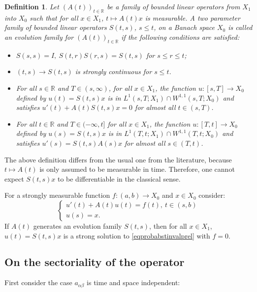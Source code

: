 \documentclass{amsart}
\theoremstyle{plain}
\theoremstyle{remark}
\theoremstyle{plain}
\newtheorem{definition}[theorem]{Definition}
\numberwithin{equation}{section}
\begin{document}
\begin{definition}\label{def:evolut}
Let $(A(t))_{t\in { \mathbb{R} }}$ be a family of bounded linear operators from $X_1$ into $X_0$ such that for all $x\in X_1$, $t\mapsto A(t)x$ is measurable.
A two parameter family of bounded linear operators $S(t,s)$, $s\leq t$, on a Banach space $X_{0}$ is called an \textit{evolution family for $(A(t))_{t\in { \mathbb{R} }}$} if the following conditions are satisfied:
\begin{itemize}
\item[(i)] $S(s,s)=I,\ S(t,r)S(r,s)=S(t,s)$ for $s\leq r\leq t$;
\item[(ii)] $(t,s)\rightarrow S(t,s)$ is strongly continuous for $s\leq t$.
\item[(iii)] For all $s\in { \mathbb{R} }$ and $T\in (s, \infty)$, for all $x\in X_1$, the function $u:[s,T]\to X_0$
defined by $u(t) = S(t,s)x$ is in $L^1(s,T;X_1)\cap W^{1,1}(s,T;X_0)$ and satisfies $u'(t) + A(t) S(t,s)x=0$ for almost all $t\in(s,T)$.
\item[(iv)]
For all $t\in { \mathbb{R} }$ and $T\in (-\infty, t]$ for all $x\in X_1$, the function $u:[T,t]\to X_0$ defined by $u(s) = S(t,s)x$ is in $L^{1}(T,t;X_1)\cap W^{1,1}(T,t;X_0)$ and satisfies $u'(s) = S(t,s) A(s) x$ for almost all $s\in (T, t)$.
\end{itemize}
\end{definition}
The above definition differs from the usual one from the literature, because $t\mapsto A(t)$ is only assumed to be measurable in time. Therefore, one cannot expect $S(t,s)x$ to be differentiable in the classical sense.

For a strongly measurable function $f:(a,b)\to X_{0}$ and $x\in X_0$ consider:
\begin{equation}\label{eqprobabstinvalprel}
\begin{cases}
u'(t)+A(t)u(t)=f(t),\ t\in (s,b)\\
u(s)=x.
\end{cases}
\end{equation}
If $A(t)$ generates an evolution family $S(t,s)$, then for all $x\in X_1$, $u(t) = S(t,s)x$ is a strong solution to \eqref{eqprobabstinvalprel} with $f=0$.

\subsection{On the sectoriality of the operator}

First consider the case $a_{\alpha\beta}$ is time and space independent:
\end{document}
